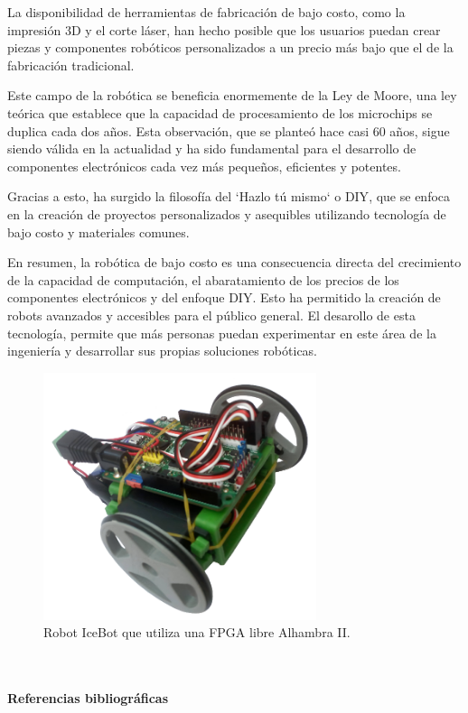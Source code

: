 La disponibilidad de herramientas de fabricación de bajo costo, como la impresión 3D y el corte láser, 
han hecho posible que los usuarios puedan crear piezas y componentes robóticos personalizados a un 
precio más bajo que el de la fabricación tradicional.

Este campo de la robótica se beneficia enormemente de la Ley de Moore, una ley teórica 
que establece que la capacidad de procesamiento de los microchips se duplica cada dos años. Esta observación, que 
se planteó hace casi 60 años, sigue siendo válida en la actualidad y ha sido fundamental para el desarrollo de componentes 
electrónicos cada vez más pequeños, eficientes y potentes.

Gracias a esto, ha surgido la filosofía del `Hazlo tú mismo` o \ac{DIY}, que se enfoca en la creación de proyectos personalizados y 
asequibles utilizando tecnología de bajo costo y materiales comunes.

En resumen, la robótica de bajo costo es una consecuencia directa del crecimiento de la capacidad de computación, 
el abaratamiento de los precios de los componentes electrónicos y del enfoque \ac{DIY}. Esto ha permitido la creación 
de robots avanzados y accesibles para el público general.
El desarollo de esta tecnología, permite que más personas puedan experimentar en este área de la ingeniería y desarrollar 
sus propias soluciones robóticas. 

\begin{figure} [h!]
  \begin{center}
    \includegraphics[width=8cm]{figs/icebot.png}
  \end{center}
  \caption{Robot IceBot que utiliza una FPGA libre Alhambra II.}
  \label{fig:robSecundaria}
\end{figure}\
\newpage

\paragraph{Referencias bibliográficas}
\label{sec:referencias}

